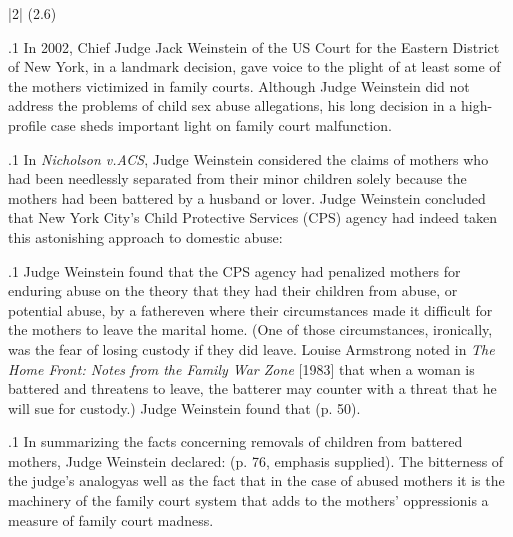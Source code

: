 \documentclass[11pt, twoside]{article}
\begin{document}
{\s|2|{ (2.6)}

\p.1{%
\noindent{}In 2002, Chief Judge Jack Weinstein of the US Court for the Eastern
District of New York, in a landmark decision, gave voice to the plight of
at least some of the mothers victimized in family courts. Although Judge
Weinstein did not address the problems of child sex abuse allegations,
his long decision in a high-profile case sheds important light on family
court malfunction.
}%

\p.1{%
In \textit{Nicholson v.\@ ACS}, Judge Weinstein considered the claims of
mothers who had been needlessly separated from their minor children solely because the mothers had been battered by a husband or
lover. Judge Weinstein concluded that New York City’s Child Protective Services (CPS) agency had indeed taken this astonishing approach
to domestic abuse: 
}%

\p.1{%
Judge Weinstein found that the CPS agency had penalized mothers for enduring abuse on the theory that they had 
their children from abuse, or potential abuse, by a father\mdash{}even where
their circumstances made it difficult for the mothers to leave the marital home. (One of those circumstances, ironically, was the fear of losing
custody if they did leave. Louise Armstrong noted in \textit{The Home Front: Notes
from the Family War Zone} [1983] that when a woman is battered and
threatens to leave, the batterer may counter with a threat that he will sue
for custody.) Judge Weinstein found that  (p. 50).
}%

\p.1{%
In summarizing the facts concerning removals of children from battered mothers, Judge Weinstein declared:  (p. 76, emphasis supplied). The bitterness of the judge’s analogy\mdash{}as well as the
fact that in the case of abused mothers it is the machinery of the family court system that adds to the mothers’ oppression\mdash{}is a measure of
family court madness.
}%


}
\end{document}
